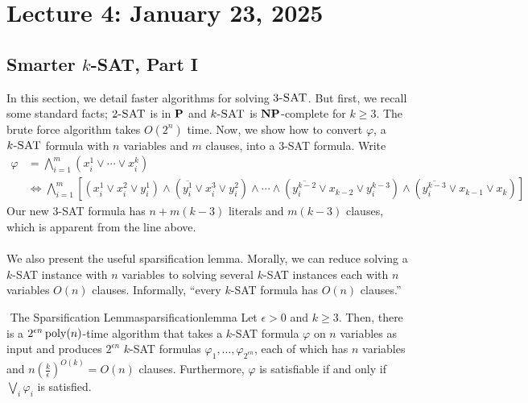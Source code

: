 \pagebreak

\section{Lecture 4: January 23, 2025}

    \subsection{Smarter \(k\)-SAT, Part I}

        In this section, we detail faster algorithms for solving \(3\textsc{-SAT}\). But first, we recall some standard facts; \(2\textsc{-SAT}\) is in \(\mathbf{P}\) and \(k\textsc{-SAT}\) is \(\mathbf{NP}\)-complete for \(k\geq3\). The brute force algorithm takes \(O(2^n)\) time. Now, we show how to convert \(\varphi\), a \(k\textsc{-SAT}\) formula with \(n\) variables and \(m\) clauses, into a \(3\)-\textsc{SAT} formula. Write
        \begin{align*}
            \varphi&=\bigwedge_{i=1}^m \left(x_i^1\vee \cdots \vee x_i^k\right) \\
            &\iff\bigwedge_{i=1}^m \left[(x_i^1\vee x_i^2\vee y_i^1)\wedge \left(\overline{y_i^1}\vee x_i^3\vee y_i^2\right)\wedge\cdots\wedge\left(\overline{y_i^{k-2}}\vee x_{k-2}\vee y_i^{k-3}\right)\wedge\left(\overline{y_i^{k-3}}\vee x_{k-1}\vee x_k\right)\right]
        \end{align*}
        Our new \(3\)-\textsc{SAT} formula has \(n+m(k-3)\) literals and \(m(k-3)\) clauses, which is apparent from the line above.
        \\
        \\
        We also present the useful sparsification lemma. Morally, we can reduce solving a \(k\)-\textsc{SAT} instance with \(n\) variables to solving several \(k\)-\textsc{SAT} instances each with \(n\) variables \(O(n)\) clauses. Informally, ``every \(k\)-\textsc{SAT} formula has \(O(n)\) clauses.''
        \begin{theorem}{\Stop\,\,The Sparsification Lemma}{sparsificationlemma}
            Let \(\epsilon>0\) and \(k\geq3\). Then, there is a \(2^{\epsilon n}\operatorname{poly}(n)\)-time algorithm that takes a \(k\)-\textsc{SAT} formula \(\varphi\) on \(n\) variables as input and produces \(2^{\epsilon n}\) \(k\)-\textsc{SAT} formulas \(\varphi_1,\ldots,\varphi_{2^{\epsilon n}}\), each of which has \(n\) variables and \(n\left(\frac{k}{\epsilon}\right)^{O(k)}=O(n)\) clauses. Furthermore, \(\varphi\) is satisfiable if and only if \(\bigvee_i \varphi_i\) is satisfied.
        \end{theorem}
